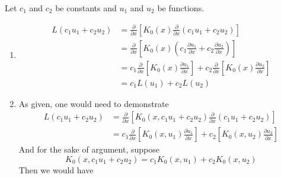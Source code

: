 \documentclass[a4paper]{article}
\begin{document}

Let \( c_{1} \) and \( c_{2} \) be constants and \( u_{1} \) and \( u_{2} \) be functions.

\begin{enumerate}[label=(\alph*)]
	\item \begin{align*}
		L \!\left( c_{1}u_{1} + c_{2}u_{2} \right) & = \frac{\partial }{\partial x}\!\left[ K_{0}\!\left( x \right)\frac{\partial }{\partial x}\!\left( c_{1}u_{1} + c_{2}u_{2} \right) \right] \\
		 & = \frac{\partial }{\partial x}\!\left[ K_{0}\!\left( x \right)\!\left( c_{1}\frac{\partial u_{1}}{\partial x} + c_{2}\frac{\partial u_{2}}{\partial x} \right) \right] \\ 
		 & = c_{1}\frac{\partial }{\partial x}\!\left[ K_{0}\!\left( x \right)\frac{\partial u_{1}}{\partial x} \right] + c_{2}\frac{\partial }{\partial x}\!\left[ K_{0}\!\left( x \right)\frac{\partial u_{2}}{\partial x} \right] \\
		 & = c_{1}L \!\left( u_{1} \right) + c_{2}L \!\left( u_{2} \right)
	\end{align*}
	\item As given, one would need to demonstrate 
	\begin{align*}
		L \!\left( c_{1}u_{1} + c_{2}u_{2} \right) & = \frac{\partial }{\partial x}\!\left[ K_{0}\!\left( x, c_{1}u_{1} + c_{2}u_{2} \right)\frac{\partial }{\partial x}\!\left( c_{1}u_{1} + c_{2}u_{2} \right) \right] \\
		 & = c_{1}\frac{\partial }{\partial x}\!\left[ K_{0}\!\left( x,u_{1} \right)\frac{\partial u_{1}}{\partial x} \right] + c_{2}\!\left[ K_{0}\!\left( x,u_{2} \right)\frac{\partial u_{2}}{\partial x} \right]
	\end{align*}
	And for the sake of argument, suppose
	\[
		K_{0}\!\left( x,c_{1}u_{1} + c_{2}u_{2} \right) = c_{1}K_{0}\!\left( x,u_{1} \right) + c_{2}K_{0}\!\left( x,u_{2} \right) 
	\]
	Then we would have

\end{enumerate}
\end{document}
